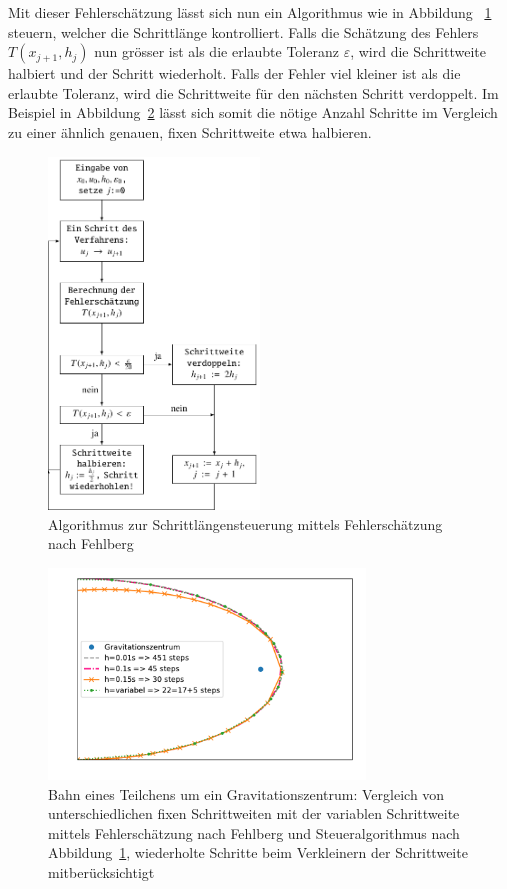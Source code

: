 Mit dieser Fehlerschätzung lässt sich nun ein Algorithmus wie in Abbildung ~\ref{buch:steps:flowchartfehlberg} steuern,
welcher die Schrittlänge kontrolliert. Falls die Schätzung des Fehlers $T(x_{j+1}, h_j)$ nun grösser ist als die erlaubte Toleranz $\varepsilon$,
wird die Schrittweite halbiert und der Schritt wiederholt.
Falls der Fehler viel kleiner ist als die erlaubte Toleranz, wird die Schrittweite für den nächsten Schritt verdoppelt.
Im Beispiel in Abbildung~\ref{buch:steps:comparisonFixedVariableFehlberg} lässt sich somit die nötige Anzahl Schritte
im Vergleich zu einer ähnlich genauen, fixen Schrittweite etwa halbieren.

\begin{figure}
  \centering
  \includegraphics[width=0.5\textwidth]{papers/steps/img/Fehlberg_Flowchart.pdf}
  \caption{Algorithmus zur Schrittlängensteuerung mittels Fehlerschätzung nach Fehlberg
  \cite{steps:Numerische-Mathematik}
    \label{buch:steps:flowchartfehlberg}}
\end{figure}

\begin{figure}
  \centering
  \includegraphics[width=0.75\textwidth]{papers/steps/img/comparison_fehlberg_ssc.pdf}
  \caption{Bahn eines Teilchens um ein Gravitationszentrum: Vergleich von unterschiedlichen fixen Schrittweiten
  mit der variablen Schrittweite mittels Fehlerschätzung nach Fehlberg und Steueralgorithmus nach Abbildung~\ref{buch:steps:flowchartfehlberg},
  wiederholte Schritte beim Verkleinern der Schrittweite mitberücksichtigt}
  \label{buch:steps:comparisonFixedVariableFehlberg}
\end{figure}
